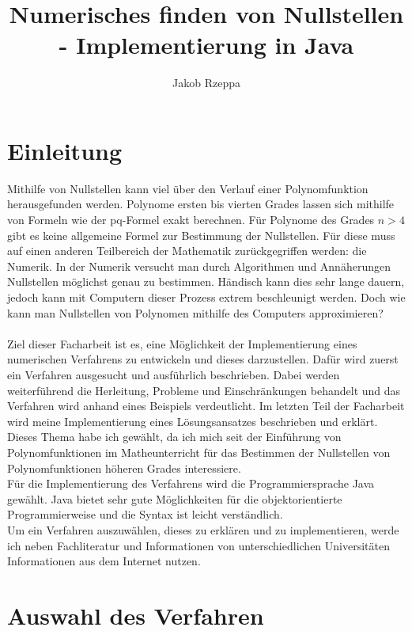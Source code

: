 \documentclass[12pt]{article}
\title{Numerisches finden von Nullstellen - Implementierung in Java}
\author{Jakob Rzeppa}
\begin{document}
\tableofcontents

\section{Einleitung}
Mithilfe von Nullstellen kann viel über den Verlauf einer Polynomfunktion herausgefunden werden. Polynome ersten bis vierten Grades lassen sich mithilfe von Formeln wie der pq-Formel exakt berechnen. 
Für Polynome des Grades $n > 4$ gibt es keine allgemeine Formel zur Bestimmung der Nullstellen. Für diese muss auf einen anderen Teilbereich der Mathematik zurückgegriffen werden: die Numerik. 
In der Numerik versucht man durch Algorithmen und Annäherungen Nullstellen möglichst genau zu bestimmen. Händisch kann dies sehr lange dauern, jedoch kann mit Computern dieser Prozess extrem beschleunigt werden.
Doch wie kann man Nullstellen von Polynomen mithilfe des Computers approximieren?\\
\\
Ziel dieser Facharbeit ist es, eine Möglichkeit der Implementierung eines numerischen Verfahrens zu entwickeln und dieses darzustellen. Dafür wird zuerst ein Verfahren ausgesucht und ausführlich beschrieben. 
Dabei werden weiterführend die Herleitung, Probleme und Einschränkungen behandelt und das Verfahren wird anhand eines Beispiels verdeutlicht. 
Im letzten Teil der Facharbeit wird meine Implementierung eines Lösungsansatzes beschrieben und erklärt.\\
Dieses Thema habe ich gewählt, da ich mich seit der Einführung von Polynomfunktionen im Matheunterricht für das Bestimmen der Nullstellen von Polynomfunktionen höheren Grades interessiere.
\\
Für die Implementierung des Verfahrens wird die Programmiersprache Java gewählt. Java bietet sehr gute Möglichkeiten für die objektorientierte Programmierweise und die Syntax ist leicht verständlich.\\
Um ein Verfahren auszuwählen, dieses zu erklären und zu implementieren, werde ich neben Fachliteratur und Informationen von unterschiedlichen Universitäten Informationen aus dem Internet nutzen.

\section{Auswahl des Verfahren}
\end{document}
